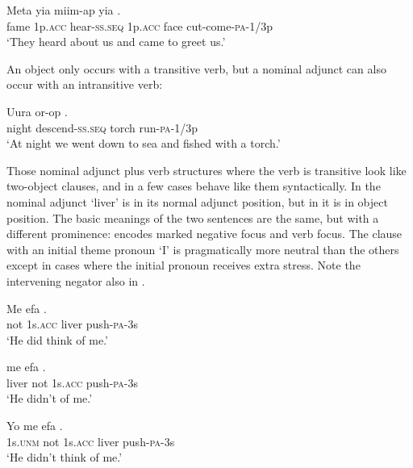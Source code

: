 \ea%
\label{ex:3:x450}
\gll Meta yia miim-ap yia  . \\
fame 1p.\textsc{acc} hear-\textsc{ss}.\textsc{seq} 1p.\textsc{acc} face cut-come-\textsc{pa}-1/3p\\
\glt`They heard about us and came to greet us.'
\z

An object  only occurs with a transitive verb, but a nominal adjunct can also occur with an intransitive verb:

\ea%
\label{ex:3:x451}
\gll Uura or-op  . \\
night descend-\textsc{ss}.\textsc{seq} torch run-\textsc{pa}-1/3p\\
\glt`At night we went down to sea and fished with a torch.'
\z

Those nominal adjunct plus verb structures where the verb is transitive look like two-object clauses, and in a few cases behave like them syntactically. In  the nominal adjunct  `liver' is in its normal adjunct position, but in  it is in object  position. The basic meanings of the two sentences are the same, but with a different prominence:  encodes marked negative focus and  verb focus. The clause  with an initial theme pronoun  `I' is pragmatically more neutral than the others except in cases where the initial pronoun receives extra stress. Note the intervening negator also in . 

\ea%
\label{ex:3:x452}
\gll Me efa  . \\
not 1s.\textsc{acc} liver push-\textsc{pa}-3s\\
\glt`He did  think of me.'
\z

\ea%
\label{ex:3:x453}
\gll {} me efa . \\
liver not 1s.\textsc{acc} push-\textsc{pa}-3s\\
\glt`He didn't  of me.'
\z

\ea%
\label{ex:3:x1874}
\gll Yo me efa  . \\
1s.\textsc{unm} not 1s.\textsc{acc} liver push-\textsc{pa}-3s\\
\glt`He didn't think of me.'
\z

